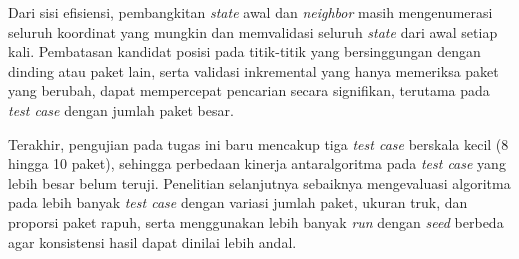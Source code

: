 Dari sisi efisiensi, pembangkitan \textit{state} awal dan \textit{neighbor} masih mengenumerasi seluruh koordinat yang mungkin dan memvalidasi seluruh \textit{state} dari awal setiap kali. Pembatasan kandidat posisi pada titik-titik yang bersinggungan dengan dinding atau paket lain, serta validasi inkremental yang hanya memeriksa paket yang berubah, dapat mempercepat pencarian secara signifikan, terutama pada \textit{test case} dengan jumlah paket besar.

Terakhir, pengujian pada tugas ini baru mencakup tiga \textit{test case} berskala kecil (8 hingga 10 paket), sehingga perbedaan kinerja antaralgoritma pada \textit{test case} yang lebih besar belum teruji. Penelitian selanjutnya sebaiknya mengevaluasi algoritma pada lebih banyak \textit{test case} dengan variasi jumlah paket, ukuran truk, dan proporsi paket rapuh, serta menggunakan lebih banyak \textit{run} dengan \textit{seed} berbeda agar konsistensi hasil dapat dinilai lebih andal.